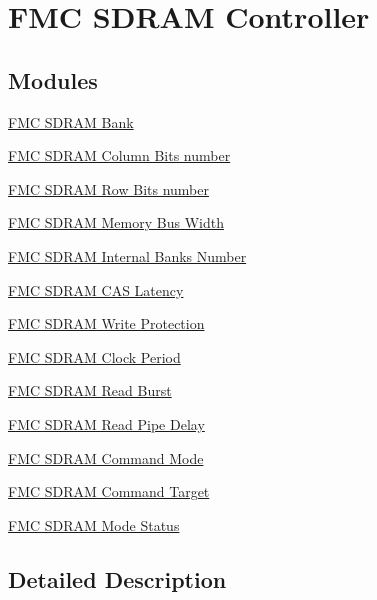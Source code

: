 \hypertarget{group___f_m_c___l_l___s_d_r_a_m___controller}{}\section{F\+MC S\+D\+R\+AM Controller}
\label{group___f_m_c___l_l___s_d_r_a_m___controller}
\subsection*{Modules}
\begin{DoxyCompactItemize}
\item 
\hyperlink{group___f_m_c___s_d_r_a_m___bank}{F\+M\+C S\+D\+R\+A\+M Bank}
\item 
\hyperlink{group___f_m_c___s_d_r_a_m___column___bits__number}{F\+M\+C S\+D\+R\+A\+M Column Bits number}
\item 
\hyperlink{group___f_m_c___s_d_r_a_m___row___bits__number}{F\+M\+C S\+D\+R\+A\+M Row Bits number}
\item 
\hyperlink{group___f_m_c___s_d_r_a_m___memory___bus___width}{F\+M\+C S\+D\+R\+A\+M Memory Bus Width}
\item 
\hyperlink{group___f_m_c___s_d_r_a_m___internal___banks___number}{F\+M\+C S\+D\+R\+A\+M Internal Banks Number}
\item 
\hyperlink{group___f_m_c___s_d_r_a_m___c_a_s___latency}{F\+M\+C S\+D\+R\+A\+M C\+A\+S Latency}
\item 
\hyperlink{group___f_m_c___s_d_r_a_m___write___protection}{F\+M\+C S\+D\+R\+A\+M Write Protection}
\item 
\hyperlink{group___f_m_c___s_d_r_a_m___clock___period}{F\+M\+C S\+D\+R\+A\+M Clock Period}
\item 
\hyperlink{group___f_m_c___s_d_r_a_m___read___burst}{F\+M\+C S\+D\+R\+A\+M Read Burst}
\item 
\hyperlink{group___f_m_c___s_d_r_a_m___read___pipe___delay}{F\+M\+C S\+D\+R\+A\+M Read Pipe Delay}
\item 
\hyperlink{group___f_m_c___s_d_r_a_m___command___mode}{F\+M\+C S\+D\+R\+A\+M Command Mode}
\item 
\hyperlink{group___f_m_c___s_d_r_a_m___command___target}{F\+M\+C S\+D\+R\+A\+M Command Target}
\item 
\hyperlink{group___f_m_c___s_d_r_a_m___mode___status}{F\+M\+C S\+D\+R\+A\+M Mode Status}
\end{DoxyCompactItemize}


\subsection{Detailed Description}
